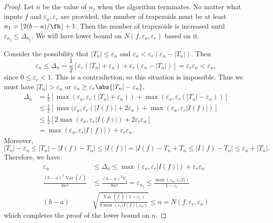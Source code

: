 \documentclass{iitthesis}
\DeclareMathOperator{\Var}{Var}
\newcommand{\oV}{\overline{V}}
\newcommand{\hcut}{\fh}
\begin{document}
\begin{proof} Let $n$ be the value of $n_j$ when the algorithm terminates. No matter what inputs $f$ and $\varepsilon_{a},\varepsilon_{r}$ are provided, the number of trapezoids must be at least $n_1 = \left \lfloor 2(b-a)/\hcut \right \rfloor +1$.  Then the number of trapezoids is increased until $\varepsilon_{n_j}  \le \Delta_{n_j}$. We will have lower bound on $N(f,\varepsilon_{a},\varepsilon_r)$ based on it.

Consider the possibility that  $|T_{n}| \le \varepsilon_{n}$ and $\varepsilon_{a} < \varepsilon_{r}(\varepsilon_{n}-|T_{n}|)$. Then 
$$\varepsilon_{n} \leq \Delta_{n}=\frac{1}{2}[\varepsilon_{r}(|T_{n}|+\varepsilon_{n})+\varepsilon_{r}(\varepsilon_{n}-|T_{n}|)]=\varepsilon_{r}\varepsilon_n <\varepsilon_n,
$$since $0\leq\varepsilon_{r}<1$. This is a contradiction, so this situation is impossible.
Thus we must have $|T_{n}| > \varepsilon_{n}$ or $\varepsilon_{a} \geq \varepsilon_{r}\abs{ |T_{n}|-\varepsilon_{n}},$
\begin{align*}
\Delta_{n}&=\frac{1}{2}[\max(\varepsilon_{a},\varepsilon_{r}(|T_{n}|+\varepsilon_{n}))+\max(\varepsilon_{a},\varepsilon_{r}(|T_{n}|-\varepsilon_{n}))]
\\&\leq \frac{1}{2}[\max(\varepsilon_{a},\varepsilon_{r}(|I(f)|+2\varepsilon_{n})+\max(\varepsilon_{a},\varepsilon_{r}|I(f)|)]
\\&\leq \frac{1}{2}[2\max(\varepsilon_{a},\varepsilon_{r}|I(f)|)+2\varepsilon_{r}\varepsilon_{n}]    
\\&=\max(\varepsilon_{a},\varepsilon_{r}|I(f)|)+\varepsilon_{r}\varepsilon_{n}.
\end{align*}
Moreover,
\begin{equation}\label{uneven}
|T_{n}|-\varepsilon_{n}\leq |T_{n}|-|I(f)-T_{n}|\leq|I(f)|=|I(f)-T_{n}+T_{n}
\leq|I(f)-T_{n}|\leq\varepsilon_{n}+|T_{n}|.
\end{equation}
Therefore, we have 
\begin{align*}
\varepsilon_{n}&\leq \Delta_{n} \le \max(\varepsilon_{a},\varepsilon_{r}|I(f)|)+\varepsilon_{r}\varepsilon_{n}\\
\frac{(b-a)^{2}\Var(f^{'})}{8n^{2}}&\leq\frac{(b-a)^{2}\displaystyle \oV_j}{8n^{2}}=\varepsilon_{n_j}\leq\frac{\max(\varepsilon_{a},\varepsilon_{r}|I|)}{1-\varepsilon_{r}}
\\(b-a)&\sqrt{\frac{\Var(f^{'})(1-\varepsilon_{r})}{8\max(\varepsilon_{r}|I(f)|,\varepsilon_{a})}}\leq n=N(f,\varepsilon_{r},\varepsilon_{a})
\end{align*}
which completes the proof of the lower bound on $n$.



\end{proof}
\end{document}
